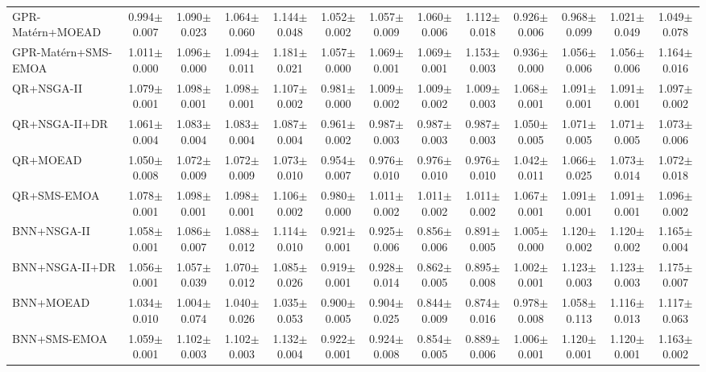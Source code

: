 \begin{table}[htbp]
{\begin{tabular}{l c c c c c c c c c c c c}
GPR-Mat\'ern+MOEAD & 0.994$\pm$0.007 & 1.090$\pm$0.023 & 1.064$\pm$0.060 & 1.144$\pm$0.048 & 1.052$\pm$0.002 & 1.057$\pm$0.009 & 1.060$\pm$0.006 & 1.112$\pm$0.018 & 0.926$\pm$0.006 & 0.968$\pm$0.099 & 1.021$\pm$0.049 & 1.049$\pm$0.078 \\
GPR-Mat\'ern+SMS-EMOA & 1.011$\pm$0.000 & 1.096$\pm$0.000 & 1.094$\pm$0.011 & 1.181$\pm$0.021 & 1.057$\pm$0.000 & 1.069$\pm$0.001 & 1.069$\pm$0.001 & 1.153$\pm$0.003 & 0.936$\pm$0.000 & 1.056$\pm$0.006 & 1.056$\pm$0.006 & 1.164$\pm$0.016 \\
QR+NSGA-II & 1.079$\pm$0.001 & 1.098$\pm$0.001 & 1.098$\pm$0.001 & 1.107$\pm$0.002 & 0.981$\pm$0.000 & 1.009$\pm$0.002 & 1.009$\pm$0.002 & 1.009$\pm$0.003 & 1.068$\pm$0.001 & 1.091$\pm$0.001 & 1.091$\pm$0.001 & 1.097$\pm$0.002 \\
QR+NSGA-II+DR & 1.061$\pm$0.004 & 1.083$\pm$0.004 & 1.083$\pm$0.004 & 1.087$\pm$0.004 & 0.961$\pm$0.002 & 0.987$\pm$0.003 & 0.987$\pm$0.003 & 0.987$\pm$0.003 & 1.050$\pm$0.005 & 1.071$\pm$0.005 & 1.071$\pm$0.005 & 1.073$\pm$0.006 \\
QR+MOEAD & 1.050$\pm$0.008 & 1.072$\pm$0.009 & 1.072$\pm$0.009 & 1.073$\pm$0.010 & 0.954$\pm$0.007 & 0.976$\pm$0.010 & 0.976$\pm$0.010 & 0.976$\pm$0.010 & 1.042$\pm$0.011 & 1.066$\pm$0.025 & 1.073$\pm$0.014 & 1.072$\pm$0.018 \\
QR+SMS-EMOA & 1.078$\pm$0.001 & 1.098$\pm$0.001 & 1.098$\pm$0.001 & 1.106$\pm$0.002 & 0.980$\pm$0.000 & 1.011$\pm$0.002 & 1.011$\pm$0.002 & 1.011$\pm$0.002 & 1.067$\pm$0.001 & 1.091$\pm$0.001 & 1.091$\pm$0.001 & 1.096$\pm$0.002 \\
BNN+NSGA-II & 1.058$\pm$0.001 & 1.086$\pm$0.007 & 1.088$\pm$0.012 & 1.114$\pm$0.010 & 0.921$\pm$0.001 & 0.925$\pm$0.006 & 0.856$\pm$0.006 & 0.891$\pm$0.005 & 1.005$\pm$0.000 & 1.120$\pm$0.002 & 1.120$\pm$0.002 & 1.165$\pm$0.004 \\
BNN+NSGA-II+DR & 1.056$\pm$0.001 & 1.057$\pm$0.039 & 1.070$\pm$0.012 & 1.085$\pm$0.026 & 0.919$\pm$0.001 & 0.928$\pm$0.014 & 0.862$\pm$0.005 & 0.895$\pm$0.008 & 1.002$\pm$0.001 & 1.123$\pm$0.003 & 1.123$\pm$0.003 & 1.175$\pm$0.007 \\
BNN+MOEAD & 1.034$\pm$0.010 & 1.004$\pm$0.074 & 1.040$\pm$0.026 & 1.035$\pm$0.053 & 0.900$\pm$0.005 & 0.904$\pm$0.025 & 0.844$\pm$0.009 & 0.874$\pm$0.016 & 0.978$\pm$0.008 & 1.058$\pm$0.113 & 1.116$\pm$0.013 & 1.117$\pm$0.063 \\
BNN+SMS-EMOA & 1.059$\pm$0.001 & 1.102$\pm$0.003 & 1.102$\pm$0.003 & 1.132$\pm$0.004 & 0.922$\pm$0.001 & 0.924$\pm$0.008 & 0.854$\pm$0.005 & 0.889$\pm$0.006 & 1.006$\pm$0.001 & 1.120$\pm$0.001 & 1.120$\pm$0.001 & 1.163$\pm$0.002 \\

\end{tabular}}
\end{table}
